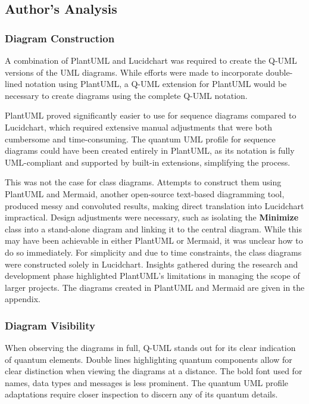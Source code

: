 \documentclass{article}
\begin{document}
\subsection{Author's Analysis}

\subsubsection{Diagram Construction}

A combination of PlantUML and Lucidchart was required to create the Q-UML versions of the UML diagrams. While efforts were made to incorporate double-lined notation using PlantUML, a Q-UML extension for PlantUML would be necessary to create diagrams using the complete Q-UML notation.

PlantUML proved significantly easier to use for sequence diagrams compared to Lucidchart, which required extensive manual adjustments that were both cumbersome and time-consuming. The quantum UML profile for sequence diagrams could have been created entirely in PlantUML, as its notation is fully UML-compliant and supported by built-in extensions, simplifying the process.

This was not the case for class diagrams. Attempts to construct them using PlantUML and Mermaid, another open-source text-based diagramming tool, produced messy and convoluted results, making direct translation into Lucidchart impractical. Design adjustments were necessary, such as isolating the \textbf{Minimize} class into a stand-alone diagram and linking it to the central diagram. While this may have been achievable in either PlantUML or Mermaid, it was unclear how to do so immediately. For simplicity and due to time constraints, the class diagrams were constructed solely in Lucidchart. Insights gathered during the research and development phase highlighted PlantUML's limitations in managing the scope of larger projects\cite{plantreddit}. The diagrams created in PlantUML and Mermaid are given in the appendix. 

\subsubsection{Diagram Visibility}

When observing the diagrams in full, Q-UML stands out for its clear indication of quantum elements. Double lines highlighting quantum components allow for clear distinction when viewing the diagrams at a distance. The bold font used for names, data types and messages is less prominent. The quantum UML profile adaptations require closer inspection to discern any of its quantum details.
\end{document}
